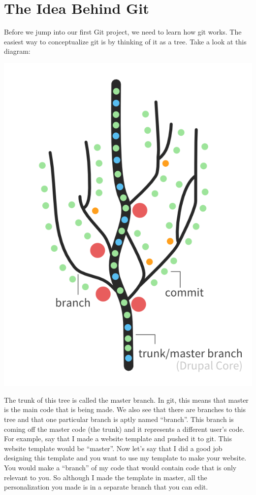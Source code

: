 \documentclass[11pt,fleqn]{article}
\theoremstyle{definition}
\begin{document}
\section{The Idea Behind Git}
Before we jump into our first Git project, we need to learn how git works. The easiest way to
conceptualize git is by thinking of it as a tree. Take a look at this diagram:

\begin{center} 
\includegraphics[scale=.5]{gitDiagram}
\end{center}

The trunk of this tree is called the master branch. In git, this means that master is the main code
that is being made. We also see that there are branches to this tree and that one particular branch
is aptly named ``branch''. This branch is coming off the master code (the trunk) and it represents a
different user's code. For example, say that I made a website template and pushed it to git. This
website template would be ``master''. Now let's say that I did a good job designing this template and you
 want to use my template to make your website. You would make a ``branch'' of my code that would
contain code that is only relevant to you. So although I made the template in master, all the
personalization you made is in a separate branch that you can edit. 
\end{document}
